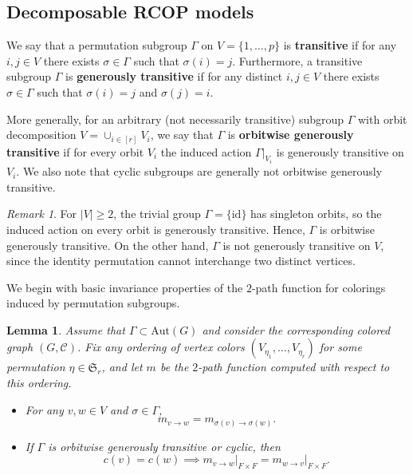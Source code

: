 \documentclass[12pt]{amsart}
\theoremstyle{plain}
\newtheorem{lemma}[theorem]{Lemma}
\theoremstyle{definition}
\theoremstyle{remark}
\newtheorem{remark}[theorem]{Remark}
\newcommand{\1}{\mathbf{1}}
\begin{document}
\subsection{Decomposable RCOP models}\label{sec:decomp}
We say that a permutation subgroup $\Gamma$ on $V=\{1,\ldots,p\}$ is \textbf{transitive} if for any $i,j\in V$ there exists $\sigma\in\Gamma$ such that $\sigma(i)=j$.
Furthermore, a transitive subgroup $\Gamma$ is \textbf{generously transitive} if for any distinct $i,j\in V$ there exists $\sigma\in\Gamma$ such that $\sigma(i)=j$ and $\sigma(j)=i$.

More generally, for an arbitrary (not necessarily transitive) subgroup $\Gamma$ with orbit decomposition
$V=\cup_{i\in [r]}  V_i$, we say that $\Gamma$ is \textbf{orbitwise generously transitive} if for every orbit $V_i$
the induced action $\Gamma|_{V_i}$ is generously transitive on $V_i$. We also note that cyclic subgroups are generally not orbitwise generously transitive. 

\begin{remark}\label{rem:trivial-group}
For $|V|\geq 2$, the trivial group $\Gamma=\{\mathrm{id}\}$ has singleton orbits, so the induced action on every orbit is generously transitive. Hence, $\Gamma$ is orbitwise generously transitive. On the other hand, $\Gamma$ is not generously transitive on $V$, since the identity permutation cannot interchange two distinct vertices.
\end{remark}


We begin with basic invariance properties of the $2$-path function for colorings induced by permutation subgroups.

\begin{lemma}\label{lem:GG}
Assume that $\Gamma\subset\mathrm{Aut}(G)$ and consider the corresponding colored graph $(G,\mathcal{C})$. Fix any ordering of vertex colors $(V_{\eta_1},\ldots,V_{\eta_r})$ for some permutation $\eta\in\mathfrak{S}_r$, and let $m$ be the $2$-path function computed with respect to this ordering. 
    \begin{itemize}
        \item[(i)] For any $v,w\in V$ and $\sigma\in\Gamma$,
        \[
      m_{v\to w} = m_{\sigma(v)\to \sigma(w)}.  
        \]
        \item[(ii)] If $\Gamma$ is orbitwise generously transitive or cyclic, then 
        \[
        c(v)=c(w) \implies  m_{v\to w}\big|_{F\times F} = m_{w\to v}\big|_{F\times F}. 
        \]
    \end{itemize}
\end{lemma}
\end{document}
